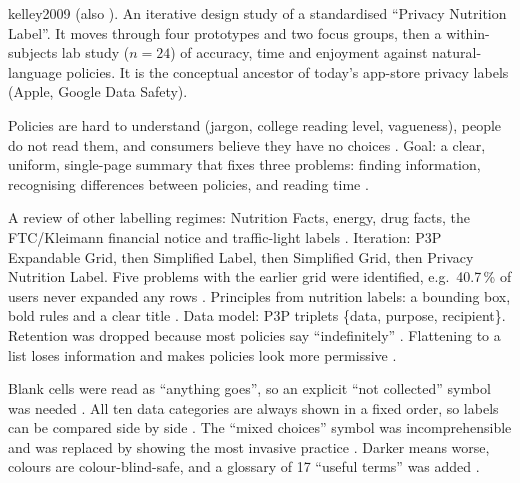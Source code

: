 \begin{papercard}{kelley2009}
  (also  ). An iterative design study of a standardised ``Privacy Nutrition Label''. It moves through four prototypes and two focus groups, then a within-subjects lab study ($n=24$) of accuracy, time and enjoyment against natural-language policies. It is the conceptual ancestor of today's app-store privacy labels (Apple, Google Data Safety).

 Policies are hard to understand (jargon, college reading level, vagueness), people do not read them, and consumers believe they have no choices . Goal: a clear, uniform, single-page summary that fixes three problems: finding information, recognising differences between policies, and reading time .

 A review of other labelling regimes: Nutrition Facts, energy, drug facts, the FTC/Kleimann financial notice and traffic-light labels . Iteration: P3P Expandable Grid, then Simplified Label, then Simplified Grid, then Privacy Nutrition Label. Five problems with the earlier grid were identified, e.g.\ 40.7\,\% of users never expanded any rows . Principles from nutrition labels: a bounding box, bold rules and a clear title . Data model: P3P triplets \{data, purpose, recipient\}. Retention was dropped because most policies say ``indefinitely'' . Flattening to a list loses information and makes policies look more permissive .

 Blank cells were read as ``anything goes'', so an explicit ``not collected'' symbol was needed . All ten data categories are always shown in a fixed order, so labels can be compared side by side . The ``mixed choices'' symbol was incomprehensible and was replaced by showing the most invasive practice . Darker means worse, colours are colour-blind-safe, and a glossary of 17 ``useful terms'' was added .


\end{papercard}
